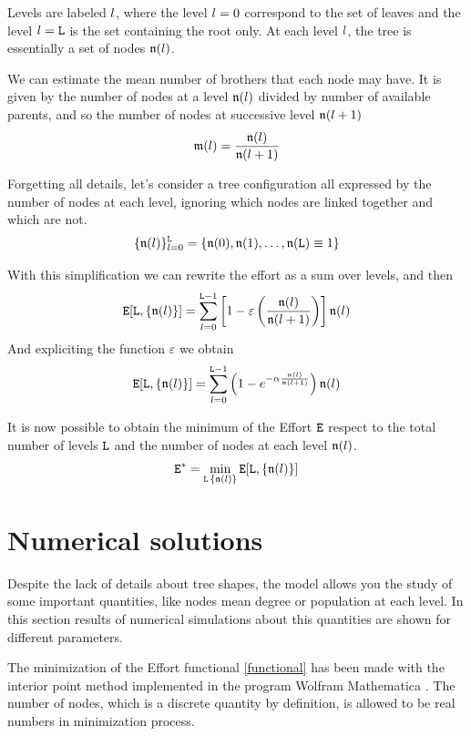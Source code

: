 Levels are labeled $\mathnormal l$, where the level $\mathnormal l=0$ correspond to the set of leaves and the level $\mathnormal l=\mathtt L$ is the set containing the root only. 
At each level $\mathnormal l$, the tree is essentially a set of nodes $\mathfrak n(\mathnormal l)$.

We can estimate the mean number of brothers that each node may have. It is given by the number of nodes at a level $\mathfrak n(\mathnormal l)$ divided by number of available parents, and so the number of nodes at successive level $\mathfrak n(\mathnormal l+1)$
\[ \mathfrak m(\mathnormal l) = \frac{\mathfrak n(\mathnormal l)}{\mathfrak n(\mathnormal l+1)} \]

Forgetting all details, let's consider a tree configuration all expressed by the number of nodes at each level, ignoring which nodes are linked together and which are not.
\[ \{ \mathfrak n(\mathnormal l) \}_{\mathnormal l=0}^{\mathtt L} = \{ \mathfrak n(0), \mathfrak n(1), \dots, \mathfrak n(\mathtt L)\equiv 1\} \]

With this simplification we can rewrite the effort as a sum over levels, and then
\[ \mathtt E [\mathtt L,\{ \mathfrak n(\mathnormal l) \}] = \sum_{\mathnormal l=0}^{\mathtt L-1} \left [ 1 - \varepsilon \left ( \frac{\mathfrak n(\mathnormal l)}{\mathfrak n(\mathnormal l+1)} \right ) \right ] \mathfrak n(\mathnormal l) \]
And expliciting the function $\varepsilon$ we obtain
\begin{equation}
\label{functional}
\mathtt E [\mathtt L,\{ \mathfrak n(\mathnormal l) \}] = \sum_{\mathnormal l=0}^{\mathtt L-1} \left ( 1 - e^{- \alpha \frac{\mathfrak n(\mathnormal l)}{\mathfrak n(\mathnormal l+1)}} \right ) \mathfrak n(\mathnormal l)
\end{equation}
 
It is now possible to obtain the minimum of the Effort $\mathtt E$ respect to the total number of levels $\mathtt L$ and the number of nodes at each level $\mathfrak n(\mathnormal l)$.
\[ \mathtt E^* = \min_{\mathtt L \, \{ \mathfrak n(\mathnormal l) \}} \mathtt E [\mathtt L,\{ \mathfrak n(\mathnormal l) \}]  \]

\section{Numerical solutions}
Despite the lack of details about tree shapes, the model allows you the study of some important quantities, like nodes mean degree or population at each level. In this section results of numerical simulations about this quantities are shown for different parameters.

The minimization of the Effort functional \eqref{functional} has been made with the interior point method implemented in the program Wolfram Mathematica \cite{math}. The number of nodes, which is a discrete quantity by definition, is allowed to be real numbers in minimization process.

